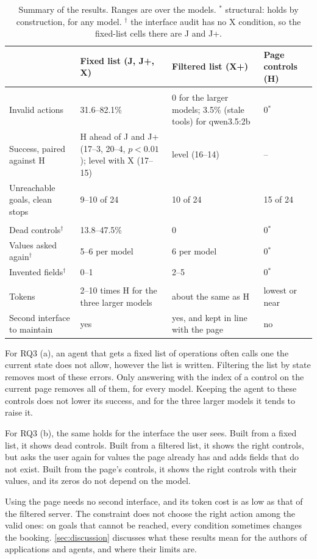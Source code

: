 \begin{table}[htbp]
\centering
\small
\caption{Summary of the results. Ranges are over the models. $^{*}$ structural: holds by construction, for any model. $^{\dagger}$ the interface audit has no X condition, so the fixed-list cells there are J and J+.}
\label{tab:eval:summary}
\begin{tabularx}{\textwidth}{>{\raggedright\arraybackslash}p{}XXX}
\hline
& Fixed list (J, J+, X) & Filtered list (X+) & Page controls (H) \\
\hline
\multicolumn{4}{l}{\emph{RQ3 (a): the agent}} \\
Invalid actions & 31.6--82.1\% & 0 for the larger models; 3.5\% (stale tools) for qwen3.5:2b & 0$^{*}$ \\
Success, paired against H & H ahead of J and J+ (17--3, 20--4, $p < 0.01$); level with X (17--15) & level (16--14) & -- \\
Unreachable goals, clean stops & 9--10 of 24 & 10 of 24 & 15 of 24 \\
\hline
\multicolumn{4}{l}{\emph{RQ3 (b): the interface}} \\
Dead controls$^{\dagger}$ & 13.8--47.5\% & 0 & 0$^{*}$ \\
Values asked again$^{\dagger}$ & 5--6 per model & 6 per model & 0$^{*}$ \\
Invented fields$^{\dagger}$ & 0--1 & 2--5 & 0$^{*}$ \\
\hline
\multicolumn{4}{l}{\emph{Cost}} \\
Tokens & 2--10 times H for the three larger models & about the same as H & lowest or near \\
Second interface to maintain & yes & yes, and kept in line with the page & no \\
\hline
\end{tabularx}
\end{table}

For RQ3 (a), an agent that gets a fixed list of operations often calls one the current state does not allow, however the list is written.
Filtering the list by state removes most of these errors.
Only answering with the index of a control on the current page removes all of them, for every model.
Keeping the agent to these controls does not lower its success, and for the three larger models it tends to raise it.

For RQ3 (b), the same holds for the interface the user sees.
Built from a fixed list, it shows dead controls.
Built from a filtered list, it shows the right controls, but asks the user again for values the page already has and adds fields that do not exist.
Built from the page's controls, it shows the right controls with their values, and its zeros do not depend on the model.

Using the page needs no second interface, and its token cost is as low as that of the filtered server.
The constraint does not choose the right action among the valid ones: on goals that cannot be reached, every condition sometimes changes the booking.
\autoref{sec:discussion} discusses what these results mean for the authors of applications and agents, and where their limits are.

